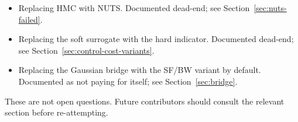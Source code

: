 \begin{itemize}
  \item Replacing HMC with NUTS. Documented dead-end; see
        Section~\ref{sec:nuts-failed}.
  \item Replacing the soft surrogate with the hard indicator.
        Documented dead-end; see Section~\ref{sec:control-cost-variants}.
  \item Replacing the Gaussian bridge with the SF/BW variant by
        default. Documented as not paying for itself; see
        Section~\ref{sec:bridge}.
\end{itemize}

These are not open questions. Future contributors should consult the
relevant section before re-attempting.
